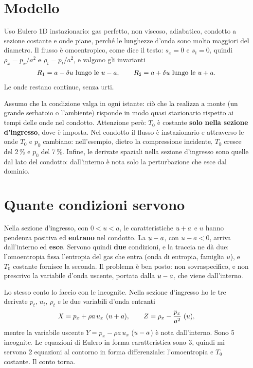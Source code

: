 \section*{Modello}
Uso Eulero 1D instazionario: gas perfetto, non viscoso, adiabatico, condotto a sezione costante e onde piane,
perché le lunghezze d'onda sono molto maggiori del diametro. Il flusso è omoentropico, come dice il testo:
$s_x=0$ e $s_t=0$, quindi $\rho_x=p_x/a^2$ e $\rho_t=p_t/a^2$, e valgono gli invarianti
\begin{gather*}
  R_1=a-\delta u\ \text{lungo le $u-a$} ,\qquad R_2=a+\delta u\ \text{lungo le $u+a$}.
\end{gather*}
Le onde restano continue, senza urti.

Assumo che la condizione valga in ogni istante: ciò che la realizza a monte (un grande serbatoio o l'ambiente)
risponde in modo quasi stazionario rispetto ai tempi delle onde nel condotto. Attenzione però: $T_0$ è costante
\textbf{solo nella sezione d'ingresso}, dove è imposta. Nel condotto il flusso è instazionario e attraverso le onde
$T_0$ e $p_0$ cambiano: nell'esempio, dietro la compressione incidente, $T_0$ cresce del 2\,\% e $p_0$ del 7\,\%.
Infine, le derivate spaziali nella sezione d'ingresso sono quelle dal lato del condotto: dall'interno è nota solo
la perturbazione che esce dal dominio.

\section*{Quante condizioni servono}
Nella sezione d'ingresso, con $0<u<a$, le caratteristiche $u+a$ e $u$ hanno pendenza positiva ed
\textbf{entrano} nel condotto. La $u-a$, con $u-a<0$, arriva dall'interno ed \textbf{esce}. Servono quindi
\textbf{due} condizioni, e la traccia ne dà due: l'omoentropia fissa l'entropia del gas che entra (onda di entropia,
famiglia $u$), e $T_0$ costante fornisce la seconda. Il problema è ben posto: non sovraspecifico, e non prescrivo la
variabile d'onda uscente, portata dalla $u-a$, che viene dall'interno.

Lo stesso conto lo faccio con le incognite. Nella sezione d'ingresso ho le tre derivate $p_t$, $u_t$, $\rho_t$ e le
due variabili d'onda entranti
\begin{gather*}
  X=p_x+\rho a\,u_x\ (u+a) ,\qquad Z=\rho_x-\frac{p_x}{a^2}\ (u),
\end{gather*}
mentre la variabile uscente $Y=p_x-\rho a\,u_x$ ($u-a$) è nota dall'interno. Sono 5 incognite. Le equazioni di
Eulero in forma caratteristica sono 3, quindi mi servono 2 equazioni al contorno in forma differenziale:
l'omoentropia e $T_0$ costante. Il conto torna.

